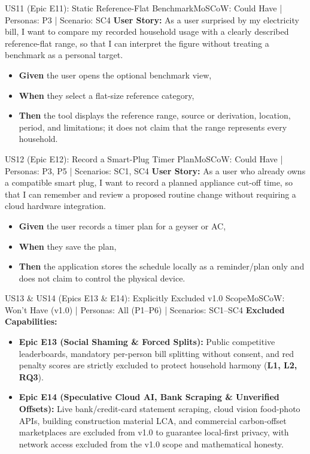 \documentclass[12pt, a4paper]{article}
\begin{document}
\begin{storybox}{US11 (Epic E11): Static Reference-Flat Benchmark}{MoSCoW: Could Have | Personas: P3 | Scenario: SC4}
\textbf{User Story:} As a user surprised by my electricity bill, I want to compare my recorded household usage with a clearly described reference-flat range, so that I can interpret the figure without treating a benchmark as a personal target.
\begin{itemize}
    \item \textbf{Given} the user opens the optional benchmark view,
    \item \textbf{When} they select a flat-size reference category,
    \item \textbf{Then} the tool displays the reference range, source or derivation, location, period, and limitations; it does not claim that the range represents every household.
\end{itemize}
\end{storybox}

\begin{storybox}{US12 (Epic E12): Record a Smart-Plug Timer Plan}{MoSCoW: Could Have | Personas: P3, P5 | Scenarios: SC1, SC4}
\textbf{User Story:} As a user who already owns a compatible smart plug, I want to record a planned appliance cut-off time, so that I can remember and review a proposed routine change without requiring a cloud hardware integration.
\begin{itemize}
    \item \textbf{Given} the user records a timer plan for a geyser or AC,
    \item \textbf{When} they save the plan,
    \item \textbf{Then} the application stores the schedule locally as a reminder/plan only and does not claim to control the physical device.
\end{itemize}
\end{storybox}

\begin{storybox}{US13 \& US14 (Epics E13 \& E14): Explicitly Excluded v1.0 Scope}{MoSCoW: Won't Have (v1.0) | Personas: All (P1--P6) | Scenarios: SC1--SC4}
\textbf{Excluded Capabilities:}
\begin{itemize}
    \item \textbf{Epic E13 (Social Shaming \& Forced Splits):} Public competitive leaderboards, mandatory per-person bill splitting without consent, and red penalty scores are strictly excluded to protect household harmony (\textbf{L1, L2, RQ3}).
    \item \textbf{Epic E14 (Speculative Cloud AI, Bank Scraping \& Unverified Offsets):} Live bank/credit-card statement scraping, cloud vision food-photo APIs, building construction material LCA, and commercial carbon-offset marketplaces are excluded from v1.0 to guarantee local-first privacy, with network access excluded from the v1.0 scope and mathematical honesty.
\end{itemize}
\end{storybox}
\end{document}
